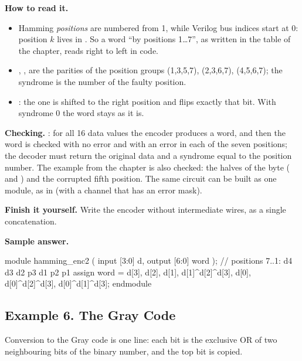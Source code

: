 \textbf{How to read it.}
\begin{itemize}
  \item Hamming \emph{positions} are numbered from 1, while Verilog bus indices start at 0: position $k$ lives in . So a word ``by positions 1\ldots 7'', as written in the table of the chapter, reads right to left in code.
  \item {}, ,  are the parities of the position groups (1,3,5,7), (2,3,6,7), (4,5,6,7); the syndrome  is the number of the faulty position.
  \item {}: the one is shifted to the right position and flips exactly that bit. With syndrome 0 the word stays as it is.
\end{itemize}
\textbf{Checking.} : for all 16 data values the encoder
produces a word, and then the word is checked with no error and with an error in
each of the seven positions; the decoder must return the original data and a
syndrome equal to the position number. The example from the chapter is also
checked: the halves of the byte  ( and ) and the
corrupted fifth position. The same circuit can be built as one module, as in
 (with a channel that has an error mask).

\textbf{Finish it yourself.} Write the encoder without intermediate wires, as a
single concatenation.

\textbf{Sample answer.}\par\nopagebreak
\begin{vcode}
module hamming_enc2 (
    input  [3:0] d,
    output [6:0] word
);
    // positions 7..1:  d4  d3  d2  p3          d1  p2          p1
    assign word = {d[3], d[2], d[1], d[1]^d[2]^d[3], d[0], d[0]^d[2]^d[3], d[0]^d[1]^d[3]};
endmodule
\end{vcode}

\subsection{Example 6. The Gray Code}

Conversion to the Gray code is one line: each bit is the exclusive OR of two
neighbouring bits of the binary number, and the top bit is copied.


